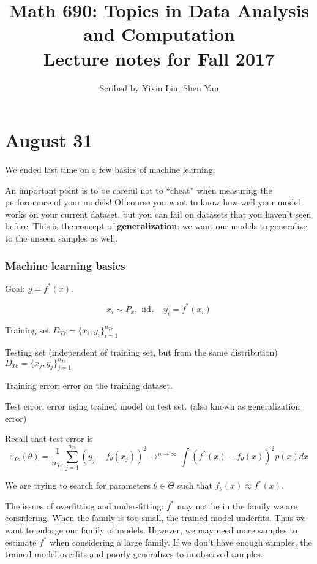 \documentclass[12pt]{article}
\title{Math 690: Topics in Data Analysis and Computation\\ \large Lecture notes for Fall 2017}
\date{}
\author{\small Scribed by Yixin Lin, Shen Yan}
\theoremstyle{plain}
\begin{document}
\maketitle

\part*{August 31}

We ended last time on a few basics of machine learning.

An important point is to be careful not to ``cheat'' when measuring the performance of your models! Of course you want to know how well your model works on your current dataset, but you can fail on datasets that you haven't seen before. This is the concept of \textbf{generalization}: we want our models to generalize to the unseen samples as well.

\section*{Machine learning basics}

Goal: $y = f^* (x)$.

$$x_i \sim P_x, \text{ iid}, \quad y_i = f^*(x_i) $$

Training set $D_{Tr} = \{x_i, y_i \}_{i=1}^{n_{Tr}}$

Testing set (independent of training set, but from the same distribution) $D_{Te} = \{x_j, y_j\}_{j=1}^{n_{Te}}$

Training error: error on the training dataset.

Test error: error using trained model on test set. (also known as generalization error)



Recall that test error is $$\varepsilon_{Te} (\theta) = \frac{1}{n_{Te}} \sum_{j=1}^{n_{Te}} (y_j - f_\theta (x_j))^2 \rightarrow^{n \rightarrow \infty} \int (f^*(x)-f_\theta(x))^2 p(x) dx$$

We are trying to search for parameters $\theta \in \Theta$ such that $ f_\theta(x) \approx f^*(x) $.

The issues of overfitting and under-fitting:
$f^*$ may not be in the family we are considering.
When the family  is too small, the trained model underfits.
Thus we want to enlarge our family of models. However, we may need more samples to estimate $f^*$ when considering a large family.
If we don't have enough samples, the trained model overfits and poorly generalizes to unobserved samples.
\end{document}
